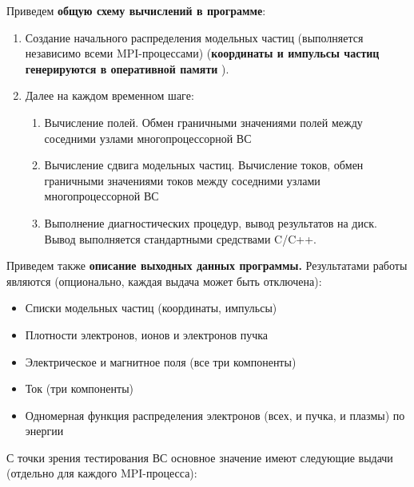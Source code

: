 Приведем \textbf{общую схему вычислений в программе}:
\begin{enumerate}
	\item Создание начального 
	распределения модельных частиц
	(выполняется независимо 
	всеми MPI-процессами) (\textbf{координаты и импульсы частиц генерируются в оперативной памяти} ). 
	\item Далее на каждом временном шаге:
	\begin{enumerate}
		\item Вычисление полей. Обмен граничными значениями полей между соседними узлами многопроцессорной ВС
		\item Вычисление сдвига модельных частиц. Вычисление токов, обмен граничными значениями токов между соседними узлами многопроцессорной ВС
		\item Выполнение диагностических процедур, вывод результатов на диск. Вывод выполняется стандартными средствами C/C++.
	\end{enumerate}	
\end{enumerate}

Приведем также
\textbf{описание выходных данных программы.}
Результатами работы являются
(опционально, каждая выдача может быть отключена):
\begin{itemize}
	\item Списки модельных частиц (координаты, импульсы)
	\item Плотности электронов, ионов и электронов пучка
	\item Электрическое и магнитное поля (все три компоненты)
	\item Ток (три компоненты)
	\item Одномерная функция распределения электронов (всех, и пучка, и плазмы) по энергии
\end{itemize}

С точки зрения тестирования ВС основное значение имеют следующие выдачи (отдельно для каждого MPI-процесса):

